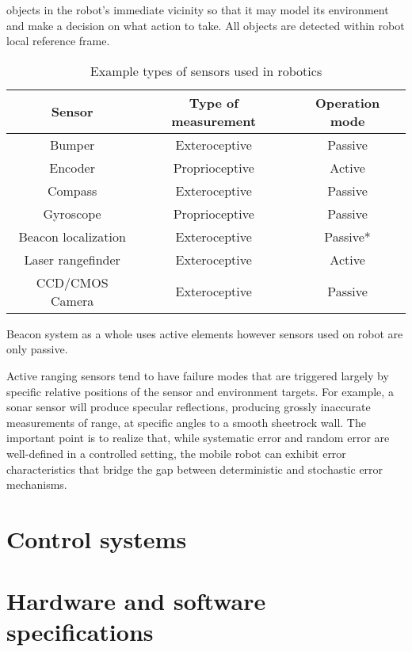 objects in the robot’s immediate vicinity so that it may model its environment and make a 
decision on what action to take. All objects are detected within robot local reference 
frame. 
\begin{table}[htb] 
	\centering
	\caption{Example types of sensors used in robotics}
	\label{tab:robot-sensors}
	\begin{tabular}{ccc}
		\hline
		\hline
		Sensor& Type of measurement& Operation mode\\
		\hline
		Bumper&  Exteroceptive& Passive\\
		Encoder& Proprioceptive& Active\\
		Compass& Exteroceptive& Passive\\
		Gyroscope& Proprioceptive& Passive\\
		Beacon localization& Exteroceptive& Passive*\\
		Laser rangefinder& Exteroceptive& Active\\
		CCD/CMOS Camera& Exteroceptive& Passive\\
		\hline
		\hline
	\end{tabular}
	\newline
	{\footnotesize *Beacon system as a whole uses active elements however sensors 
	used on robot are only passive.}
\end{table}
Active ranging sensors tend to have failure modes that are triggered largely by specific 
relative positions of the sensor and environment targets. For example, a sonar sensor will
produce specular reflections, producing grossly inaccurate measurements of range,
at specific angles to a smooth sheetrock wall.  The important point is to realize that, while 
systematic error and random error are well-defined in a controlled setting, the mobile robot can
exhibit error characteristics that bridge the gap between deterministic and stochastic error
mechanisms.



\FloatBarrier
\section{Control systems}

\FloatBarrier
\section{Hardware and software specifications}

